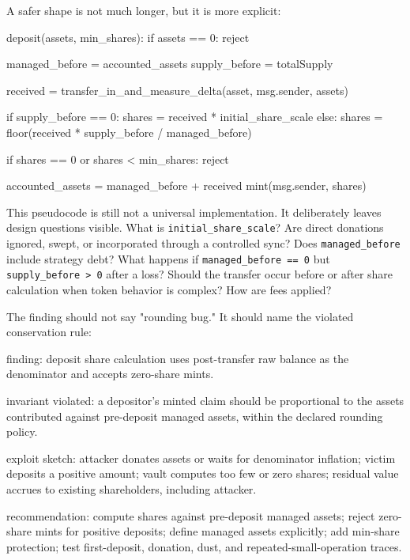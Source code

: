 A safer shape is not much longer, but it is more explicit:

\begin{codeblock}
deposit(assets, min_shares):
    if assets == 0:
        reject

    managed_before = accounted_assets
    supply_before = totalSupply

    received = transfer_in_and_measure_delta(asset, msg.sender, assets)

    if supply_before == 0:
        shares = received * initial_share_scale
    else:
        shares = floor(received * supply_before / managed_before)

    if shares == 0 or shares < min_shares:
        reject

    accounted_assets = managed_before + received
    mint(msg.sender, shares)
\end{codeblock}

This pseudocode is still not a universal implementation. It deliberately leaves design questions visible. What is \texttt{initial\_share\_scale}? Are direct donations ignored, swept, or incorporated through a controlled sync? Does \texttt{managed\_before} include strategy debt? What happens if \texttt{managed\_before == 0} but \texttt{supply\_before > 0} after a loss? Should the transfer occur before or after share calculation when token behavior is complex? How are fees applied?

The finding should not say "rounding bug." It should name the violated conservation rule:

\begin{codeblock}
finding:
    deposit share calculation uses post-transfer raw balance as the
    denominator and accepts zero-share mints.

invariant violated:
    a depositor's minted claim should be proportional to the assets
    contributed against pre-deposit managed assets, within the declared
    rounding policy.

exploit sketch:
    attacker donates assets or waits for denominator inflation;
    victim deposits a positive amount;
    vault computes too few or zero shares;
    residual value accrues to existing shareholders, including attacker.

recommendation:
    compute shares against pre-deposit managed assets;
    reject zero-share mints for positive deposits;
    define managed assets explicitly;
    add min-share protection;
    test first-deposit, donation, dust, and repeated-small-operation traces.
\end{codeblock}

